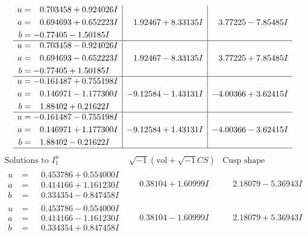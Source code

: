 \documentclass[1p]{elsarticle_modified}
\theoremstyle{definition}
\newcommand{\I}{\sqrt{-1}}
\begin{document}
$$\begin{array}{c|c|c}
\begin{aligned}
u &= \phantom{-}0.703458 + 0.924026 I \\
a &= \phantom{-}0.694693 + 0.652223 I \\
b &= -0.77405 - 1.50185 I\end{aligned}
 & \phantom{-}1.92467 + 8.33135 I & \phantom{-}3.77225 - 7.85485 I \\ \hline\begin{aligned}
u &= \phantom{-}0.703458 - 0.924026 I \\
a &= \phantom{-}0.694693 - 0.652223 I \\
b &= -0.77405 + 1.50185 I\end{aligned}
 & \phantom{-}1.92467 - 8.33135 I & \phantom{-}3.77225 + 7.85485 I \\ \hline\begin{aligned}
u &= -0.161487 + 0.755198 I \\
a &= \phantom{-}0.146971 - 1.177300 I \\
b &= \phantom{-}1.88402 + 0.21622 I\end{aligned}
 & -9.12584 - 1.43131 I & -4.00366 + 3.62415 I \\ \hline\begin{aligned}
u &= -0.161487 - 0.755198 I \\
a &= \phantom{-}0.146971 + 1.177300 I \\
b &= \phantom{-}1.88402 - 0.21622 I\end{aligned}
 & -9.12584 + 1.43131 I & -4.00366 - 3.62415 I\\
 \hline 
 \end{array}$$\newpage$$\begin{array}{c|c|c}  
\text{Solutions to }I^u_{1}& \I (\text{vol} + \sqrt{-1}CS) & \text{Cusp shape}\\
 \hline 
\begin{aligned}
u &= \phantom{-}0.453786 + 0.554000 I \\
a &= \phantom{-}0.414166 + 1.161230 I \\
b &= \phantom{-}0.334354 - 0.847458 I\end{aligned}
 & \phantom{-}0.38104 + 1.60999 I & \phantom{-}2.18079 - 5.36943 I \\ \hline\begin{aligned}
u &= \phantom{-}0.453786 - 0.554000 I \\
a &= \phantom{-}0.414166 - 1.161230 I \\
b &= \phantom{-}0.334354 + 0.847458 I\end{aligned}
 & \phantom{-}0.38104 - 1.60999 I & \phantom{-}2.18079 + 5.36943 I \\ \hline\begin{aligned}

\end{aligned}
\end{array}$$
\end{document}
